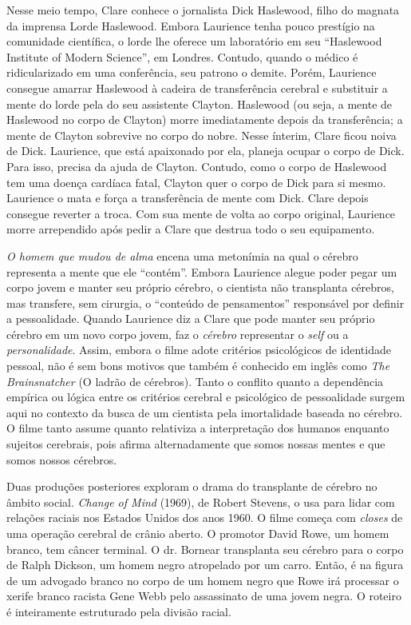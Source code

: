 Nesse meio tempo, Clare conhece o jornalista Dick Haslewood, filho do
magnata da imprensa Lorde Haslewood. Embora Laurience tenha pouco
prestígio na comunidade científica, o lorde lhe oferece um laboratório
em seu ``Haslewood Institute of Modern Science'', em Londres. Contudo,
quando o médico é ridicularizado em uma conferência, seu patrono o
demite. Porém, Laurience consegue amarrar Haslewood à cadeira de
transferência cerebral e substituir a mente do lorde pela do seu
assistente Clayton. Haslewood (ou seja, a mente de Haslewood no
corpo de Clayton) morre imediatamente depois da transferência; a mente
de Clayton sobrevive no corpo do nobre. Nesse ínterim, Clare ficou noiva
de Dick. Laurience, que está apaixonado por ela, planeja ocupar o corpo
de Dick. Para isso, precisa da ajuda de Clayton. Contudo, como o corpo
de Haslewood tem uma doença cardíaca fatal, Clayton quer o corpo de Dick
para si mesmo. Laurience o mata e força a transferência de mente com
Dick. Clare depois consegue reverter a troca. Com sua mente de volta ao
corpo original, Laurience morre arrependido após pedir a Clare que
destrua todo o seu equipamento.

\emph{O homem que mudou de alma} encena uma metonímia na qual o cérebro
representa a mente que ele ``contém''. Embora Laurience alegue poder
pegar um corpo jovem e manter seu próprio cérebro, o cientista não
transplanta cérebros, mas transfere, sem cirurgia, o ``conteúdo de
pensamentos'' responsável por definir a pessoalidade. Quando Laurience
diz a Clare que pode manter seu próprio cérebro em um novo corpo jovem,
faz o \emph{cérebro} representar o \emph{self} ou a
\emph{personalidade}. Assim, embora o filme adote critérios psicológicos
de identidade pessoal, não é sem bons motivos que também é conhecido em
inglês como \emph{The Brainsnatcher} (O ladrão de cérebros). Tanto o
conflito quanto a dependência empírica ou lógica entre os critérios
cerebral e psicológico de pessoalidade surgem aqui no contexto da busca
de um cientista pela imortalidade baseada no cérebro. O filme tanto
assume quanto relativiza a interpretação dos humanos enquanto sujeitos
cerebrais, pois afirma alternadamente que somos nossas mentes e que
somos nossos cérebros.

Duas produções posteriores exploram o drama do transplante de cérebro no
âmbito social. \emph{Change of Mind} (1969), de Robert Stevens, o usa
para lidar com relações raciais nos Estados Unidos dos anos 1960. O
filme começa com \emph{closes} de uma operação cerebral de crânio
aberto. O promotor David Rowe, um homem branco, tem câncer terminal. O
dr. Bornear transplanta seu cérebro para o corpo de Ralph Dickson, um
homem negro atropelado por um carro. Então, é na figura de um advogado
branco no corpo de um homem negro que Rowe irá processar o xerife branco
racista Gene Webb pelo assassinato de uma jovem negra. O roteiro é
inteiramente estruturado pela divisão racial.

